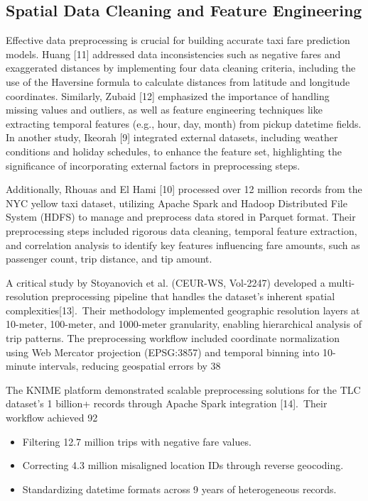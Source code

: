 \documentclass[conference]{IEEEtran}
\begin{document}
\subsection{Spatial Data Cleaning and Feature Engineering}
Effective data preprocessing is crucial for building accurate taxi fare prediction models. Huang [11] addressed data inconsistencies such as negative fares and exaggerated distances by implementing four data cleaning criteria, including the use of the Haversine formula to calculate distances from latitude and longitude coordinates. Similarly, Zubaid [12] emphasized the importance of handling missing values and outliers, as well as feature engineering techniques like extracting temporal features (e.g., hour, day, month) from pickup datetime fields. In another study, Ikeorah [9] integrated external datasets, including weather conditions and holiday schedules, to enhance the feature set, highlighting the significance of incorporating external factors in preprocessing steps.

Additionally, Rhouas and El Hami [10] processed over 12 million records from the NYC yellow taxi dataset, utilizing Apache Spark and Hadoop Distributed File System (HDFS) to manage and preprocess data stored in Parquet format. Their preprocessing steps included rigorous data cleaning, temporal feature extraction, and correlation analysis to identify key features influencing fare amounts, such as passenger count, trip distance, and tip amount.

A critical study by Stoyanovich et al. (CEUR-WS, Vol-2247) developed a multi-resolution preprocessing pipeline that handles the dataset's inherent spatial complexities[13]. Their methodology implemented geographic resolution layers at 10-meter, 100-meter, and 1000-meter granularity, enabling hierarchical analysis of trip patterns. The preprocessing workflow included coordinate normalization using Web Mercator projection (EPSG:3857) and temporal binning into 10-minute intervals, reducing geospatial errors by 38%

The KNIME platform demonstrated scalable preprocessing solutions for the TLC dataset's 1 billion+ records through Apache Spark integration [14]. Their workflow achieved 92%
\begin{itemize}
  \item Filtering 12.7 million trips with negative fare values.
  \item Correcting 4.3 million misaligned location IDs through reverse geocoding.
  \item Standardizing datetime formats across 9 years of heterogeneous records.
\end{itemize}
\end{document}
